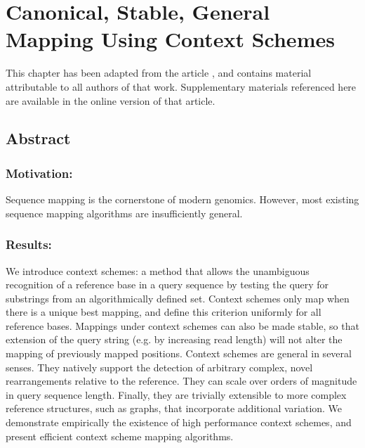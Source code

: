 \setlength{\textfloatsep}{1pt plus 1.0pt}

\newtheorem{theorem}{Theorem}
\newtheorem{lemma}{Lemma}

\chapter{Canonical, Stable, General Mapping Using Context Schemes}
\label{ch:contextschemes}

This chapter has been adapted from the article \citet{novak2015canonical}, and contains material attributable to all authors of that work. Supplementary materials referenced here are available in the online version of that article.

\section{Abstract}
\subsection{Motivation:}
Sequence mapping is the cornerstone of modern genomics. However, most existing sequence mapping algorithms are insufficiently general.

\subsection{Results:}
We introduce context schemes: a method that allows the unambiguous recognition of a reference base in a query sequence by testing the query for substrings from an algorithmically defined set. Context schemes only map when there is a unique best mapping, and define this criterion uniformly for all reference bases. Mappings under context schemes can also be made stable, so that extension of the query string (e.g. by increasing read length) will not alter the mapping of previously mapped positions. Context schemes are general in several senses. They natively support the detection of arbitrary complex, novel rearrangements relative to the reference. They can scale over orders of magnitude in query sequence length. Finally, they are trivially extensible to more complex reference structures, such as graphs, that incorporate additional variation.
We demonstrate empirically the existence of high performance context schemes, and present efficient context scheme mapping algorithms.

